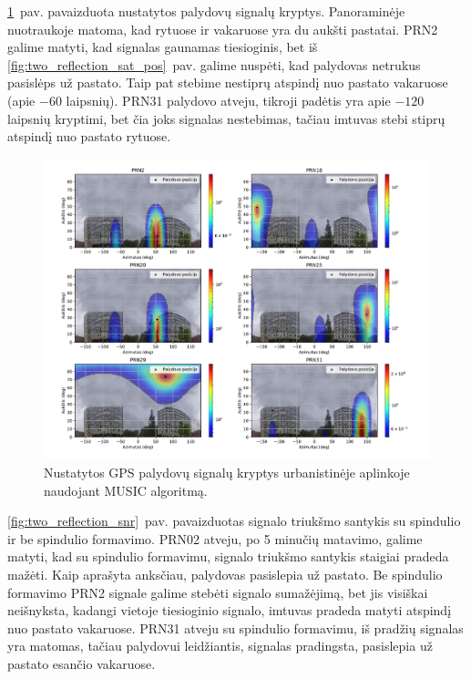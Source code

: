 \documentclass[main.tex]{subfiles}
\begin{document}
\ref{fig:two_reflection}~pav. pavaizduota nustatytos palydovų signalų kryptys.
Panoraminėje nuotraukoje matoma, kad rytuose ir vakaruose yra du aukšti pastatai.
PRN2 galime matyti, kad signalas gaunamas tiesioginis, bet iš
\ref{fig:two_reflection_sat_pos}~pav. galime nuspėti, kad palydovas netrukus
pasislėps už pastato. Taip pat stebime nestiprų atspindį nuo pastato vakaruose
(apie $-60$ laipsnių). PRN31 palydovo atveju, tikroji padėtis yra apie $-120$
laipsnių kryptimi, bet čia joks signalas nestebimas, tačiau imtuvas stebi stiprų
atspindį nuo pastato rytuose.

\begin{figure}[ht]
    \begin{centering}
    \includegraphics[scale=0.50]{drawings/two_reflections}
    \par\end{centering}
    \protect\caption{\label{fig:two_reflection}Nustatytos GPS palydovų signalų kryptys urbanistinėje aplinkoje naudojant MUSIC algoritmą.}
\end{figure}

\ref{fig:two_reflection_snr}~pav. pavaizduotas signalo triukšmo santykis su spindulio
ir be spindulio formavimo.  PRN02 atveju, po 5 minučių matavimo, galime
matyti, kad su spindulio formavimu,
signalo triukšmo santykis staigiai pradeda mažėti. Kaip aprašyta anksčiau, palydovas
pasislepia už pastato. Be spindulio formavimo PRN2 signale galime
stebėti signalo sumažėjimą, bet jis visiškai neišnyksta, kadangi
vietoje tiesioginio signalo, imtuvas pradeda matyti atspindį nuo pastato vakaruose.
PRN31 atveju su spindulio formavimu, iš pradžių signalas yra matomas, tačiau palydovui
leidžiantis, signalas pradingsta, pasislepia už pastato esančio vakaruose.
\end{document}
